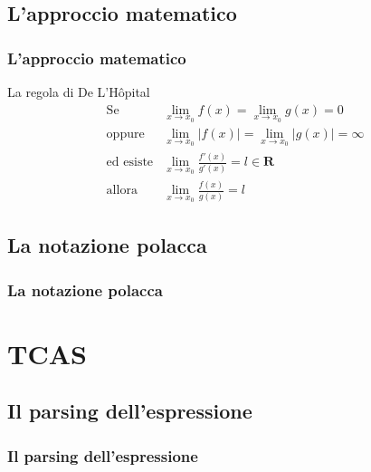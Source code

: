 \documentclass{beamer}
\begin{document}
	\subsection{L'approccio matematico}
	\begin{frame}
		\frametitle{L'approccio matematico}
		\begin{block}{La regola di De L'Hôpital}
			\[
			\begin{aligned}
				\text{Se} &\lim_{x \to x_{0}}{f(x)} = \lim_{x \to x_{0}}{g(x)} = 0 \\ \text{oppure} &\lim_{x \to x_{0}}{\lvert f(x) \rvert} = \lim_{x \to x_{0}}{\lvert g(x) \rvert} = \infty \\ \text{ed esiste} &\lim_{x \to x_{0}}{\frac{f'(x)}{g'(x)}} = l \in \mathbf{R} \\ \text{allora} &\lim_{x \to x_{0}}{\frac{f(x)}{g(x)}} = l
			\end{aligned}
			\]
		\end{block}
	\end{frame}

	\subsection{La notazione polacca}
	\begin{frame}
		\frametitle{La notazione polacca}
	\end{frame}
	
	\section{TCAS}
	
	\subsection{Il parsing dell'espressione}
	\begin{frame}
		\frametitle{Il parsing dell'espressione}
	\end{frame}
	
	
	
\end{document}
